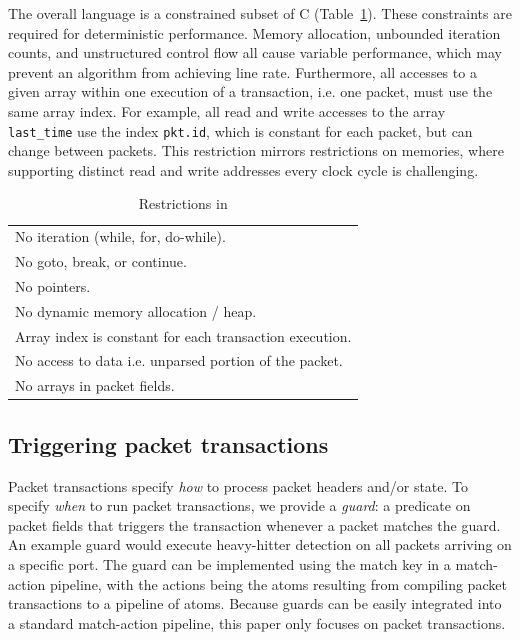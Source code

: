 The overall language is a constrained subset of C
(Table~\ref{tab:restrict}).  These constraints are required for
deterministic performance.  Memory allocation, unbounded iteration
counts, and unstructured control flow all cause variable performance,
which may prevent an algorithm from achieving line rate.
Furthermore, all accesses to a given array within one execution of a
transaction, i.e. one packet, must use the same array index. For
example, all read and write accesses to the array \texttt{last\_time}
use the index \texttt{pkt.id}, which is constant for each packet, but
can change between packets. This restriction mirrors restrictions on
memories, where supporting distinct read and write addresses every
clock cycle is challenging.

\begin{table}
  \begin{tabular}{p{}}
    No iteration (while, for, do-while).\\
    No goto, break, or continue.\\
    No pointers.\\
    No dynamic memory allocation / heap.\\
    Array index is constant for each transaction execution.\\
    No access to data i.e. unparsed portion of the packet.\\
    No arrays in packet fields.\\
  \end{tabular}
  \caption{Restrictions in \pktlanguage}
  \label{tab:restrict}
\end{table}

\subsection{Triggering packet transactions}
\label{ss:guards}
Packet transactions specify \textit{how} to process packet headers and/or
state.  To specify {\em when} to run packet transactions, we provide a {\em
guard}: a predicate on packet fields that triggers the transaction whenever a
packet matches the guard. An example guard would execute heavy-hitter detection
on all packets arriving on a specific port. The guard can be implemented using
the match key in a match-action pipeline, with the actions being the atoms
resulting from compiling packet transactions to a pipeline of atoms. Because
guards can be easily integrated into a standard match-action pipeline, this
paper only focuses on packet transactions.

